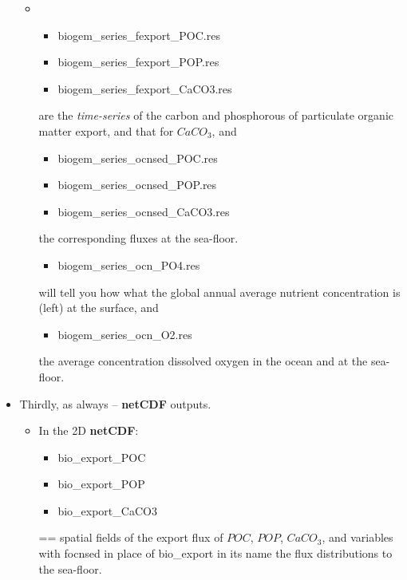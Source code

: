 \begin{itemize}[noitemsep]
\vspace{1mm}
\begin{itemize}[noitemsep]
\item []
\begin{itemize}[noitemsep]
\item [] \textsf{\footnotesize biogem\_series\_fexport\_POC.res}
\item [] \textsf{\footnotesize biogem\_series\_fexport\_POP.res}
\item [] \textsf{\footnotesize biogem\_series\_fexport\_CaCO3.res}
\end{itemize}
\vspace{1mm}
are the \textit{time-series} of the carbon and phosphorous of particulate organic matter export, and that for \(CaCO_{3}\), and
\vspace{1mm}
\begin{itemize}[noitemsep]
\item [] \textsf{\footnotesize biogem\_series\_ocnsed\_POC.res}
\item [] \textsf{\footnotesize biogem\_series\_ocnsed\_POP.res}
\item [] \textsf{\footnotesize biogem\_series\_ocnsed\_CaCO3.res}
\end{itemize}
\vspace{1mm}
the corresponding fluxes at the sea-floor.
\begin{itemize}[noitemsep]
\item [] \textsf{\footnotesize biogem\_series\_ocn\_PO4.res}
\end{itemize}
will tell you how what the global annual average nutrient concentration is (left) at the surface, and
\begin{itemize}[noitemsep]
\item [] \textsf{\footnotesize biogem\_series\_ocn\_O2.res}
\end{itemize}
the average concentration dissolved oxygen in the ocean and at the sea-floor.
\end{itemize}

\vspace{2mm}
\item Thirdly, as always -- \textbf{netCDF} outputs.

\begin{itemize}[noitemsep]
\vspace{1mm}
\item In the 2D \textbf{netCDF}:
\vspace{1mm}
\begin{itemize}[noitemsep]
\item [] \textsf{\footnotesize bio\_export\_POC}
\item [] \textsf{\footnotesize bio\_export\_POP}
\item [] \textsf{\footnotesize bio\_export\_CaCO3}
\end{itemize}
== spatial fields of the export flux of \(POC\), \(POP\), \(CaCO_{3}\), and variables with \textsf{\footnotesize focnsed} in place of \textsf{\footnotesize bio\_export} in its name the flux distributions to the sea-floor.


\end{itemize}
\end{itemize}
